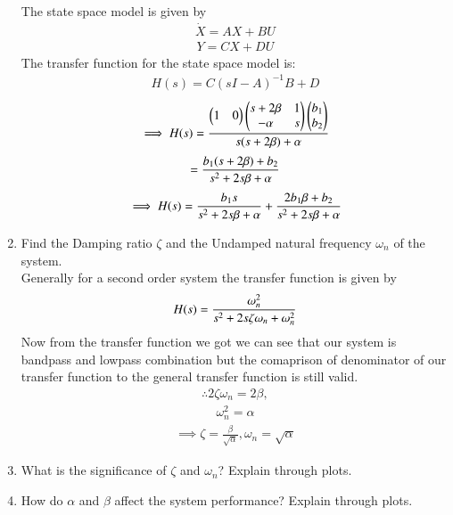 \begin{enumerate}[label=\thesubsection.\arabic*.,ref=\thesubsection.\theenumi]
\solution The state space model is given by
\begin{align}
\dot{X} = AX + BU
\end{align}
\begin{align}
Y = CX + DU
\end{align}
%
The transfer function for the state space model is:
\begin{align}
H(s) = C(sI - A)^{-1}B + D
\end{align}
\begin{align}
\implies H(s) = \frac
{
\begin{pmatrix}1&0\end{pmatrix}\begin{pmatrix}s+2\beta&1\\-\alpha&s\end{pmatrix}\begin{pmatrix}b_{1}\\b_{2}\end{pmatrix}
}
{
s(s+2\beta) + \alpha
}
\end{align}
\begin{align}
= \LARGE{\frac{b_{1}(s+2\beta) + b_{2}}{s^{2}+2s\beta+\alpha}}
\end{align}
\begin{align}
   \implies H(s) = \LARGE{\frac{b_{1}s}{s^{2}+2s\beta+\alpha}} + \LARGE{\frac{2b_{1}\beta + b_{2}}{s^{2}+2s\beta+\alpha}}
\end{align}
%
\item Find the Damping ratio $\zeta$ and the Undamped natural frequency $\omega_{n}$ of the system.
\\
\solution
Generally for a second order system the transfer function is given by
\begin{align}
H(s) = \LARGE{\frac{\omega_{n}^2}{s^{2}+2s\zeta\omega_{n}+\omega_{n}^2}}
\end{align}
Now from the transfer function we got we can see that our system is bandpass and lowpass combination but the comaprison of denominator of our transfer function to the general transfer function is still valid.
\begin{align}
\therefore 2\zeta\omega_{n} = 2\beta,
\end{align}
\begin{align}
\omega_{n}^2 = \alpha
\end{align}
\begin{align}
\implies \zeta = \frac{\beta}{\sqrt{\alpha}} , \omega_{n} = \sqrt{\alpha}
\end{align}
\item What is the significance of $\zeta$ and  $\omega_{n}$? Explain through plots.
\item How do $\alpha$ and $\beta$ affect the system performance?  Explain through plots.

\end{enumerate}
